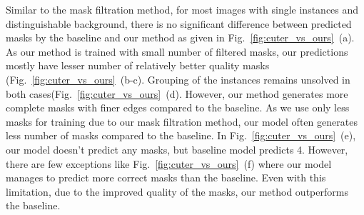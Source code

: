 Similar to the mask filtration method, for most images with single instances and distinguishable background, there is no significant difference between predicted masks by the baseline and our method as given in Fig.~\ref{fig:cuter_vs_ours}~(a). As our method is trained with small number of filtered masks, our predictions mostly have lesser number of relatively better quality masks (Fig.~\ref{fig:cuter_vs_ours}~(b-c). Grouping of the instances remains unsolved in both cases(Fig.~\ref{fig:cuter_vs_ours}~(d). However, our method generates more complete masks with finer edges compared to the baseline. As we use only less masks for training due to our mask filtration method, our model often generates less number of masks compared to the baseline. In Fig.~\ref{fig:cuter_vs_ours}~(e), our model doesn't predict any masks, but baseline model predicts 4. However, there are few exceptions like Fig.~\ref{fig:cuter_vs_ours}~(f) where our model manages to predict more correct masks than the baseline. Even with this limitation, due to the improved quality of the masks, our method outperforms the baseline.
%
%

